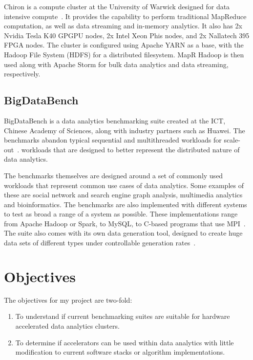 \documentclass[12pt,a4paper]{article}
\begin{document}
			Chiron is a compute cluster at the University of Warwick designed for data intensive compute~\cite{chiron-wisc-slides}. It provides the capability to perform traditional MapReduce computation, as well as data streaming and in-memory analytics. It also has 2x Nvidia Tesla K40 GPGPU nodes, 2x Intel Xeon Phis nodes, and 2x Nallatech 395 FPGA nodes. The cluster is configured using Apache YARN as a base, with the Hadoop File System (HDFS) for a distributed filesystem. MapR Hadoop is then used along with Apache Storm for bulk data analytics and data streaming, respectively.
			

		\subsection{BigDataBench} %
		\label{sub:bigdatabench}

			BigDataBench is a data analytics benchmarking suite created at the ICT, Chinese Academy of Sciences, along with industry partners such as Huawei. The benchmarks abandon typical sequential and multithreaded workloads for scale-out~\cite{big-data-bench-home}. workloads that are designed to better represent the distributed nature of data analytics.

			The benchmarks themselves are designed around a set of commonly used workloads that represent common use cases of data analytics. Some examples of these are social network and search engine graph analysis, multimedia analytics and bioinformatics. The benchmarks are also implemented with different systems to test as broad a range of a system as possible. These implementations range from Apache Hadoop or Spark, to MySQL, to C-based programs that use MPI~\cite{big-data-bench-home}. The suite also comes with its own data generation tool, designed to create huge data sets of different types under controllable generation rates~\cite{bdgs-paper}.
		


	\section{Objectives} %
	\label{sec:objectives}
	
		The objectives for my project are two-fold:

		\begin{enumerate}
			\item To understand if current benchmarking suites are suitable for hardware accelerated data analytics clusters.
			\item To determine if accelerators can be used within data analytics with little modification to current software stacks or algorithm implementations.
		\end{enumerate}
\end{document}
